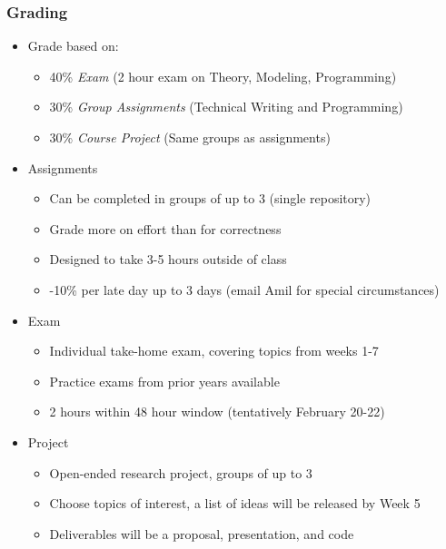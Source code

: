 \documentclass[handout]{beamer}
\begin{document}
\begin{frame}
	\frametitle{Grading}
	\pause
	\begin{itemize}[<+->]
		\item Grade based on:
		\begin{itemize}
			\item 40\% {\em Exam} (2 hour exam on Theory, Modeling, Programming)
			\item 30\% {\em Group Assignments} (Technical Writing and Programming)
			\item 30\% {\em Course Project} (Same groups as assignments)
		\end{itemize}
	
		\item Assignments
		\begin{itemize}
			\item Can be completed in groups of up to 3 (single repository)
			\item Grade more on effort than for correctness
			\item Designed to take 3-5 hours outside of class
			\item -10\% per late day up to 3 days (email Amil for special circumstances)
		\end{itemize}

		\item Exam
		\begin{itemize}
		\item Individual take-home exam, covering topics from weeks 1-7
		\item Practice exams from prior years available
		\item 2 hours within 48 hour window (tentatively February 20-22)
		\end{itemize}
	
		\item Project
		\begin{itemize}
			\item Open-ended research project, groups of up to 3 
			\item Choose topics of interest, a list of ideas will be released by Week 5
			\item Deliverables will be a proposal, presentation, and code
		\end{itemize}
	\end{itemize}
\end{frame}
\end{document}
